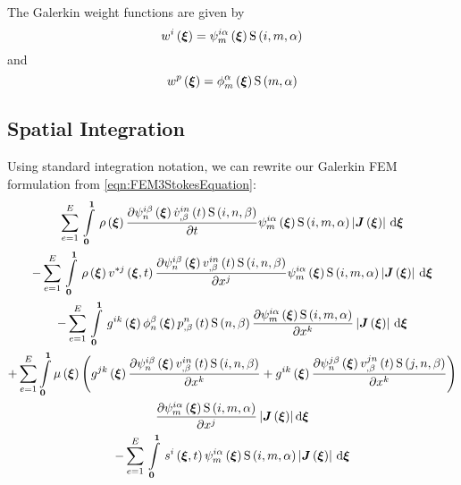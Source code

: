 The Galerkin weight functions are given by
\begin{equation}
  \fnof{w^{i}}{\vectr{\xi}}=\idxgbfn{i}{m}{\alpha}{\vectr{\xi}}\idxgsf{i}{m}{\alpha}
\end{equation}
and
\begin{equation}
  \fnof{w^{p}}{\vectr{\xi}}=\altgbfn{m}{\alpha}{\vectr{\xi}}\gsf{m}{\alpha}
\end{equation}

\subsection{Spatial Integration}

Using standard integration notation, we can rewrite our Galerkin FEM
formulation from \ref{eqn:FEM3StokesEquation}:
 \begin{multline}
   \gsum{e=1}{E}{\gint{\vectr{0}}{\vectr{1}}{\fnof{\rho}{\vectr{\xi}}\delby{\idxgbfn{i}{n}{\beta}{\vectr{\xi}}
         \fnof{\idxnodedof{\dot{v}}{i}{n}{\beta}}{t}\idxgsf{i}{n}{\beta}}{t}\idxgbfn{i}{m}{\alpha}{\vectr{\xi}}\idxgsf{i}{m}{\alpha}\abs{\fnof{\matr{J}}{\vectr{\xi}}}}{\vectr{\xi}}}\\
   -\gsum{e=1}{E}{\gint{\vectr{0}}{\vectr{1}}{\fnof{\rho}{\vectr{\xi}}
       \fnof{v^{*j}}{\vectr{\xi},t}\delby{\idxgbfn{i}{n}{\beta}{\vectr{\xi}}
         \fnof{\idxnodedof{v}{i}{n}{\beta}}{t}\idxgsf{i}{n}{\beta}}{x^{j}}\idxgbfn{i}{m}{\alpha}{\vectr{\xi}}\idxgsf{i}{m}{\alpha}\abs{\fnof{\matr{J}}{\vectr{\xi}}}}{\vectr{\xi}}}\\
   -\gsum{e=1}{E}{\gint{\vectr{0}}{\vectr{1}}{\fnof{g^{ik}}{\vectr{\xi}}\altgbfn{n}{\beta}{\vectr{\xi}}
       \fnof{\nodedof{p}{n}{\beta}}{t}\gsf{n}{\beta}\delby{\idxgbfn{i}{m}{\alpha}{\vectr{\xi}}\idxgsf{i}{m}{\alpha}}{x^{k}}\abs{\fnof{\matr{J}}{\vectr{\xi}}}}{\vectr{\xi}}}\\
   +\dsuml{e=1}{E}\dintl{\vectr{0}}{\vectr{1}}\fnof{\mu}{\vectr{\xi}}\pbrac{\fnof{g^{jk}}{\vectr{\xi}}\delby{\idxgbfn{i}{n}{\beta}{\vectr{\xi}}
     \fnof{\idxnodedof{v}{i}{n}{\beta}}{t}\idxgsf{i}{n}{\beta}}{x^{k}}
     +\fnof{g^{ik}}{\vectr{\xi}}\delby{\idxgbfn{j}{n}{\beta}{\vectr{\xi}}
     \fnof{\idxnodedof{v}{j}{n}{\beta}}{t}\idxgsf{j}{n}{\beta}}{x^{k}}} \\ \delby{\idxgbfn{i}{m}{\alpha}{\vectr{\xi}}\idxgsf{i}{m}{\alpha}}{x^{j}}\abs{\fnof{\matr{J}}{\vectr{\xi}}}\exteriorderiv{\vectr{\xi}} \\
   -\gsum{e=1}{E}{\gint{\vectr{0}}{\vectr{1}}{\fnof{s^{i}}{\vectr{\xi},t}\idxgbfn{i}{m}{\alpha}{\vectr{\xi}}\idxgsf{i}{m}{\alpha}\abs{\fnof{\matr{J}}{\vectr{\xi}}}}{\vectr{\xi}}}\\

\end{multline}
